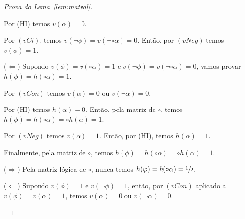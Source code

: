 \begin{proof}[Prova do Lema~\ref{lem:matval}]
\begin{provaporcasos}
\begin{provaporsubcasos}
\begin{provaporsubsubcasos}
                                Por (HI) temos $v(\alpha) = 0$.
                            
                                Por $(vCi)$, temos $v(\neg \phi) = v(\neg \circ \alpha) = 0$. Então, por $(vNeg)$ temos $v(\phi) = 1$.

                                \setcounter{buffer}{\theSubSubCasos}
                        \end{provaporsubsubcasos}
                        
                        ($\Longleftarrow$) Supondo $v(\phi) = v(\circ \alpha) = 1$ e $v(\neg \phi) = v(\neg \circ \alpha) = 0$, vamos provar $h(\phi) = h(\circ \alpha) = 1$.
                        
                        Por $(vCon)$ temos $v(\alpha) = 0$ ou $v(\neg \alpha) = 0$.

                        \begin{provaporsubsubcasos}
                            \setcounter{SubSubCasos}{\thebuffer}


                                Por (HI) temos $h(\alpha) = 0$. Então, pela matriz de $\circ$, temos $h(\phi) = h(\circ \alpha) = \circ h(\alpha) = 1$.
                            

                                Por $(vNeg)$ temos $v(\alpha) = 1$. Então, por (HI), temos $h(\alpha) = 1$. 
                                
                                Finalmente, pela matriz de $\circ$, temos $h(\phi) = h(\circ \alpha) = \circ h(\alpha) = 1$.
                        \end{provaporsubsubcasos}
                        
                        
                        ($\Longrightarrow$) Pela matriz lógica de $\circ$, nunca temos $h(\varphi) = h(\circ \alpha) = \sfrac{1}{2}{}$.
                        
                        ($\Longleftarrow$) Supondo $v(\phi) = 1$ e $v(\neg \phi) = 1$, então, por $(vCon)$ aplicado a $v(\phi) = v(\alpha) = 1$, temos $v(\alpha) = 0$ ou $v(\neg \alpha) = 0$. 
                        

\end{provaporsubcasos}
\end{provaporcasos}
\end{proof}
